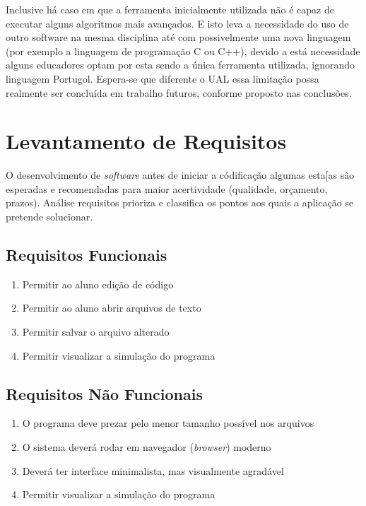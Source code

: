 Inclusive há caso em que a ferramenta inicialmente utilizada não é capaz de executar alguns algoritmos mais avançados. E isto leva a necessidade do uso de outro software na mesma disciplina até com possivelmente uma nova linguagem (por exemplo a linguagem de programação C ou C++), devido a está necessidade alguns educadores optam por esta sendo a única ferramenta utilizada, ignorando linguagem Portugol. Espera-se que diferente o UAL essa limitação possa realmente ser concluída em trabalho futuros, conforme proposto nas conclusões.

\section{Levantamento de Requisitos}


O desenvolvimento de \textit{software} antes de iniciar a códificação algumas esta[as são esperadas e recomendadas para maior acertividade (qualidade, orçamento, prazos). Análise requisitos prioriza e classifica os pontos aos quais a aplicação se pretende solucionar.

\subsection{Requisitos Funcionais}

\begin{enumerate}

\item Permitir ao aluno edição de código

\item Permitir ao aluno abrir arquivos de texto

\item Permitir salvar o arquivo alterado

\item Permitir visualizar a simulação do programa

\end{enumerate}

\subsection{Requisitos Não Funcionais}

\begin{enumerate}

\item O programa deve prezar pelo menor tamanho possível nos arquivos

\item O sistema deverá rodar em navegador (\textit{browser}) moderno

\item Deverá ter interface minimalista, mas visualmente agradável

\item Permitir visualizar a simulação do programa

\end{enumerate}

